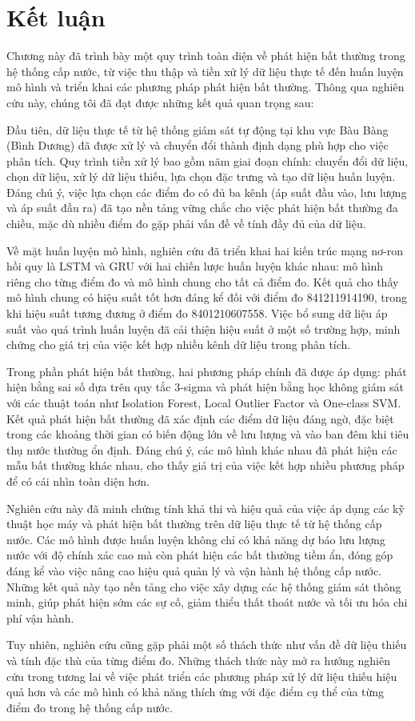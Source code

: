 \section{Kết luận}

Chương này đã trình bày một quy trình toàn diện về phát hiện bất thường trong hệ thống cấp nước, từ việc thu thập và tiền xử lý dữ liệu thực tế đến huấn luyện mô hình và triển khai các phương pháp phát hiện bất thường. Thông qua nghiên cứu này, chúng tôi đã đạt được những kết quả quan trọng sau:

Đầu tiên, dữ liệu thực tế từ hệ thống giám sát tự động tại khu vực Bàu Bàng (Bình Dương) đã được xử lý và chuyển đổi thành định dạng phù hợp cho việc phân tích. Quy trình tiền xử lý bao gồm năm giai đoạn chính: chuyển đổi dữ liệu, chọn dữ liệu, xử lý dữ liệu thiếu, lựa chọn đặc trưng và tạo dữ liệu huấn luyện. Đáng chú ý, việc lựa chọn các điểm đo có đủ ba kênh (áp suất đầu vào, lưu lượng và áp suất đầu ra) đã tạo nền tảng vững chắc cho việc phát hiện bất thường đa chiều, mặc dù nhiều điểm đo gặp phải vấn đề về tính đầy đủ của dữ liệu.

Về mặt huấn luyện mô hình, nghiên cứu đã triển khai hai kiến trúc mạng nơ-ron hồi quy là LSTM và GRU với hai chiến lược huấn luyện khác nhau: mô hình riêng cho từng điểm đo và mô hình chung cho tất cả điểm đo. Kết quả cho thấy mô hình chung có hiệu suất tốt hơn đáng kể đối với điểm đo 841211914190, trong khi hiệu suất tương đương ở điểm đo 8401210607558. Việc bổ sung dữ liệu áp suất vào quá trình huấn luyện đã cải thiện hiệu suất ở một số trường hợp, minh chứng cho giá trị của việc kết hợp nhiều kênh dữ liệu trong phân tích.

Trong phần phát hiện bất thường, hai phương pháp chính đã được áp dụng: phát hiện bằng sai số dựa trên quy tắc 3-sigma và phát hiện bằng học không giám sát với các thuật toán như Isolation Forest, Local Outlier Factor và One-class SVM. Kết quả phát hiện bất thường đã xác định các điểm dữ liệu đáng ngờ, đặc biệt trong các khoảng thời gian có biến động lớn về lưu lượng và vào ban đêm khi tiêu thụ nước thường ổn định. Đáng chú ý, các mô hình khác nhau đã phát hiện các mẫu bất thường khác nhau, cho thấy giá trị của việc kết hợp nhiều phương pháp để có cái nhìn toàn diện hơn.

Nghiên cứu này đã minh chứng tính khả thi và hiệu quả của việc áp dụng các kỹ thuật học máy và phát hiện bất thường trên dữ liệu thực tế từ hệ thống cấp nước. Các mô hình được huấn luyện không chỉ có khả năng dự báo lưu lượng nước với độ chính xác cao mà còn phát hiện các bất thường tiềm ẩn, đóng góp đáng kể vào việc nâng cao hiệu quả quản lý và vận hành hệ thống cấp nước. Những kết quả này tạo nền tảng cho việc xây dựng các hệ thống giám sát thông minh, giúp phát hiện sớm các sự cố, giảm thiểu thất thoát nước và tối ưu hóa chi phí vận hành.

Tuy nhiên, nghiên cứu cũng gặp phải một số thách thức như vấn đề dữ liệu thiếu và tính đặc thù của từng điểm đo. Những thách thức này mở ra hướng nghiên cứu trong tương lai về việc phát triển các phương pháp xử lý dữ liệu thiếu hiệu quả hơn và các mô hình có khả năng thích ứng với đặc điểm cụ thể của từng điểm đo trong hệ thống cấp nước.